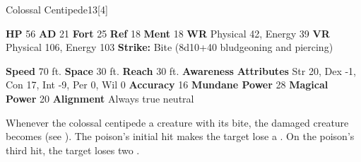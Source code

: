   \begin{monsubsection}{Colossal Centipede}{13}[4]
    \vspace{-1em}\vspace{-1em}
    \vspace{0em}

    
    

    \begin{spellcontent}
      \begin{spelltargetinginfo}
        \pari \textbf{HP} 56 \monsep
          \textbf{AD} 21 \monsep
          \textbf{Fort} 25 \monsep
          \textbf{Ref} 18 \monsep
          \textbf{Ment} 18
        \pari \textbf{WR} Physical 42, Energy 39 \monsep
        \textbf{VR} Physical 106, Energy 103
        \pari \textbf{Strike:}
            Bite  (8d10+40 bludgeoning and piercing)
      \end{spelltargetinginfo}
    \end{spellcontent}
    \begin{monsterfooter}
      \pari \textbf{Speed} 70 ft. \monsep
        \textbf{Space} 30 ft. \monsep
        \textbf{Reach} 30 ft.
      \pari \textbf{Awareness} 
      \pari \textbf{Attributes}
        Str 20, Dex -1,
        Con 17, Int -9,
        Per 0, Wil 0
      \pari \textbf{Accuracy} 16 \monsep
        \textbf{Mundane Power} 28 \monsep
      \textbf{Magical Power} 20
      \pari \textbf{Alignment} Always true neutral
    \end{monsterfooter}
  \end{monsubsection}
        Whenever the colossal centipede  a creature with its bite,
          the damaged creature becomes  (see ).
        The poison's initial hit makes the target lose a .
        On the poison's third hit, the target loses two .
  
